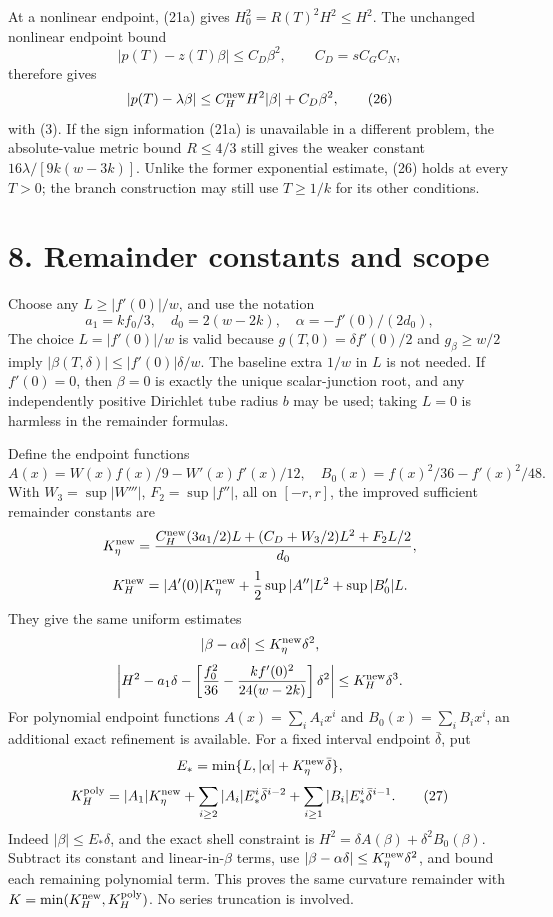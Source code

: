 \documentclass[11pt]{article}
\begin{document}
At a nonlinear endpoint, (21a) gives \(H_0^2=R(T)^2H^2\leq H^2\).
The unchanged nonlinear endpoint bound
\[
 |p(T)-z(T)\beta|\leq C_D\beta^2,
 \qquad C_D=sC_GC_N,
\]
therefore gives
\[
 |p(T)-\lambda\beta|\leq
 C_H^{\rm new}H^2|\beta|+C_D\beta^2,              \tag{26}
\]
with (3). If the sign information (21a) is unavailable in a different problem,
the absolute-value metric bound \(R\leq4/3\) still gives the weaker constant
\(16\lambda/[9k(w-3k)]\). Unlike the former exponential estimate, (26) holds at every
\(T>0\); the branch construction may still use \(T\geq1/k\) for its other
conditions.

\section{8. Remainder constants and scope}\label{remainder-constants-and-scope}

Choose any \(L\geq |f'(0)|/w\), and use the notation
\[
 a_1=kf_0/3,\quad d_0=2(w-2k),
 \quad\alpha=-f'(0)/(2d_0),
\]
The choice \(L=|f'(0)|/w\) is valid because \(g(T,0)=\delta f'(0)/2\)
and \(g_\beta\geq w/2\) imply
\(|\beta(T,\delta)|\leq |f'(0)|\delta/w\). The baseline extra \(1/w\)
in \(L\) is not needed. If \(f'(0)=0\), then \(\beta=0\) is exactly the
unique scalar-junction root, and any independently positive Dirichlet tube
radius \(b\) may be used; taking \(L=0\) is harmless in the remainder formulas.

Define the endpoint functions
\[
 A(x)=W(x)f(x)/9-W'(x)f'(x)/12,\quad
 B_0(x)=f(x)^2/36-f'(x)^2/48.
\]
With \(W_3=\sup|W'''|\), \(F_2=\sup|f''|\), all on \([-r,r]\), the
improved sufficient remainder constants are
\[
 K_\eta^{\rm new}=
 \frac{C_H^{\rm new}(3a_1/2)L+(C_D+W_3/2)L^2+F_2L/2}{d_0},
\]
\[
 K_H^{\rm new}=|A'(0)|K_\eta^{\rm new}
                 +\frac12\sup|A''|L^2+\sup|B_0'|L.
\]
They give the same uniform estimates
\[
 |\beta-\alpha\delta|\leq K_\eta^{\rm new}\delta^2,
\]
\[
 \left|H^2-a_1\delta-
 \left[\frac{f_0^2}{36}-\frac{k f'(0)^2}{24(w-2k)}\right]\delta^2\right|
 \leq K_H^{\rm new}\delta^3.
\]
For polynomial endpoint functions \(A(x)=\sum_i A_i x^i\) and
\(B_0(x)=\sum_i B_i x^i\), an additional exact refinement is available.
For a fixed interval endpoint \(\bar\delta\), put
\[
 E_* = \min\{L,|\alpha|+K_\eta^{\rm new}\bar\delta\},
\]
\[
 K_H^{\rm poly}=|A_1|K_\eta^{\rm new}
  +\sum_{i\geq2}|A_i|E_*^i\bar\delta^{i-2}
  +\sum_{i\geq1}|B_i|E_*^i\bar\delta^{i-1}.        \tag{27}
\]
Indeed \(|\beta|\leq E_*\delta\), and the exact shell constraint is
\(H^2=\delta A(\beta)+\delta^2 B_0(\beta)\). Subtract its constant and
linear-in-\(\beta\) terms, use
\(|\beta-\alpha\delta|\leq K_\eta^{\rm new}\delta^2\), and bound each
remaining polynomial term. This proves the same curvature remainder with
\(K=\min(K_H^{\rm new},K_H^{\rm poly})\). No series truncation is involved.
\end{document}

